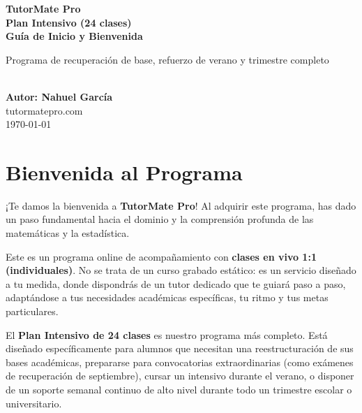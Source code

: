 \documentclass[11pt,a4paper]{article}
\begin{document}
\begin{titlepage}
    \centering
    \vspace*{2cm}
    {\Huge \color{primary} \textbf{TutorMate Pro}} \\[0.5cm]
    {\huge \color{accent} \textbf{Plan Intensivo (24 clases)}} \\[0.8cm]
    {\Large \color{gold} \textbf{Guía de Inicio y Bienvenida}} \\[1.5cm]
    
    \begin{minipage}{0.8\textwidth}
        \centering
        \large \color{primary} Programa de recuperación de base, refuerzo de verano y trimestre completo
    \end{minipage} \\[2cm]
    
    \vspace*{\fill}
    {\large \color{primary} \textbf{Autor: Nahuel García}} \\
    {\large \color{primary} tutormatepro.com} \\
    {\small \color{accent} \today}
\end{titlepage}

\newpage
\tableofcontents
\newpage

\section{Bienvenida al Programa}
¡Te damos la bienvenida a \textbf{TutorMate Pro}! Al adquirir este programa, has dado un paso fundamental hacia el dominio y la comprensión profunda de las matemáticas y la estadística. 

Este es un programa online de acompañamiento con \textbf{clases en vivo 1:1 (individuales)}. No se trata de un curso grabado estático: es un servicio diseñado a tu medida, donde dispondrás de un tutor dedicado que te guiará paso a paso, adaptándose a tus necesidades académicas específicas, tu ritmo y tus metas particulares.

El \textbf{Plan Intensivo de 24 clases} es nuestro programa más completo. Está diseñado específicamente para alumnos que necesitan una reestructuración de sus bases académicas, prepararse para convocatorias extraordinarias (como exámenes de recuperación de septiembre), cursar un intensivo durante el verano, o disponer de un soporte semanal continuo de alto nivel durante todo un trimestre escolar o universitario.
\end{document}
